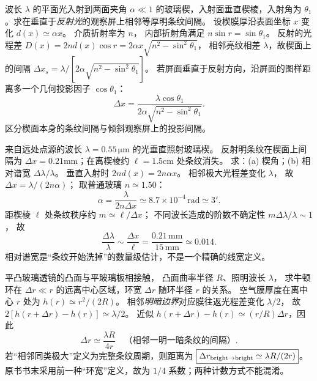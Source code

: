 波长 $\lambda$ 的平面光入射到两面夹角 $\alpha\ll1$ 的玻璃楔，入射面垂直楔棱，入射角为 $\theta_1$。求在垂直于\emph{反射光}的观察屏上相邻等厚明条纹间隔。
\exsolution
设楔膜厚沿表面坐标 $x$ 变化
$d(x)\simeq\alpha x$。
介质折射率为 $n$，
内部折射角满足
$n\sin r=\sin\theta_1$。
反射的光程差
$D(x)=2nd(x)\cos r
=2\alpha x\sqrt{n^2-\sin^2\theta_1}$，
相邻亮纹相差 $\lambda$，故楔面上的间隔
$\Delta x_s=\lambda/
[2\alpha\sqrt{n^2-\sin^2\theta_1}]$。
若屏面垂直于反射方向，沿屏面的图样距离多一个几何投影因子
$\cos\theta_1$：
\[
\boxed{\Delta x=
\frac{\lambda\cos\theta_1}
{2\alpha\sqrt{n^2-\sin^2\theta_1}}}.
\]
\excheck 区分楔面本身的条纹间隔与倾斜观察屏上的投影间隔。

来自远处点源的波长
$\lambda=0.55\,\mathrm{\mu m}$ 的光垂直照射玻璃楔。
反射明条纹在楔面上间隔为
$\Delta x=0.21$mm；在离楔棱约
$\ell=1.5$cm 处条纹消失。
求：(a) 楔角；(b) 相对谱宽 $\Delta\lambda/\lambda$。
\exsolution
垂直入射时
$2nd(x)=2n\alpha x$。
相邻极大光程差变化 $\lambda$，
故 $\Delta x=\lambda/(2n\alpha)$；
取普通玻璃 $n\simeq1.50$：
\[
\boxed{\alpha=\frac{\lambda}{2n\Delta x}
\simeq8.7\times10^{-4}\,\mathrm{rad}
\simeq3'}.
\]
距楔棱 $\ell$ 处条纹秩序约
$m\simeq\ell/\Delta x$；
不同波长造成的阶数不确定性
$m\Delta\lambda/\lambda\sim1$，
故
\[
\boxed{\frac{\Delta\lambda}{\lambda}
\sim\frac{\Delta x}{\ell}
=\frac{0.21\,\mathrm{mm}}{15\,\mathrm{mm}}
\simeq0.014}.
\]
\excheck 相对谱宽是“条纹开始洗掉”的数量级估计，不是一个精确的线宽定义。

平凸玻璃透镜的凸面与平玻璃板相接触，
凸面曲率半径 $R$、照明波长 $\lambda$，
求牛顿环在 $\Delta r\ll r$ 的远离中心区域，环宽
$\Delta r$ 随环半径 $r$ 的关系。
\exsolution
空气膜厚度在离中心 $r$ 处为
$h(r)\simeq r^2/(2R)$。
相邻\emph{明暗边界}对应膜往返光程差变化 $\lambda/2$，
故
$2[h(r+\Delta r)-h(r)]\simeq\lambda/2$。
近似
$h(r+\Delta r)-h(r)\simeq(r/R)\Delta r$，因此
\[
\boxed{\Delta r\simeq\frac{\lambda R}{4r}}
\quad\text{（相邻一明一暗条纹的间隔）}.
\]
若“相邻同类极大”定义为完整条纹周期，则距离为
$\boxed{\Delta r_{\rm bright\to bright}\simeq\lambda R/(2r)}$。
\excheck 原书书末采用前一种“环宽”定义，故为 $1/4$ 系数；两种计数方式不能混淆。
